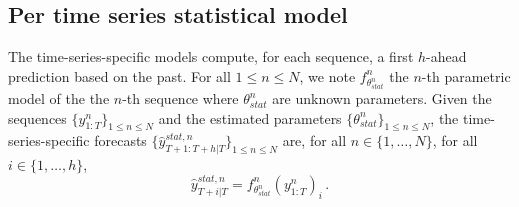 \documentclass{article} %
\newcommand{\ts}{y}
\newcommand{\fullts}{{\bf \ts}}
\newcommand{\tspred}{\hat{\ts}}
\newcommand{\stat}{f}
\newcommand{\statparam}{\theta_{stat}}
\newcommand{\lag}{h}
\begin{document}

\subsection{Per time series statistical model}
The time-series-specific models compute, for each sequence, a first $\lag$-ahead prediction based on the past. For all $1\leqslant n \leqslant N$, we note $\stat^n_{\statparam^n}$ the $n$-th parametric model of the the $n$-th sequence where $\statparam^n$ are  unknown parameters. Given the sequences $\{\ts^n_{1:T}\}_{1\leqslant n \leqslant N}$ and the estimated  parameters $\{\statparam^n\}_{1\leqslant n \leqslant N}$, the time-series-specific forecasts $\{\tspred^{stat,n}_{T+1:T+\lag|T}\}_{1\leqslant n \leqslant N}$ are, for all $n \in \{1,\ldots,N\}$, for all $i \in \{1,\ldots,\lag\}$,
$$
\tspred^{stat,n}_{T+i|T} = \stat^n_{\statparam^n}(\ts^n_{1:T})_i\,.
$$
\end{document}
